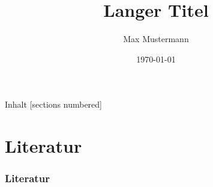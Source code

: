 \documentclass{beamer}
\title[Kurztitel]{Langer Titel}
\author{Max Mustermann}
\institute{Universität Leipzig}
\date{\today}
\begin{document}
    \maketitle

    \begin{frame}{Inhalt}
      [sections numbered]
      \tableofcontents%
    \end{frame}

    \section{Literatur}
    \begin{frame}[allowframebreaks]
        \frametitle{Literatur}
        \nocite{*}
        \printbibliography
    \end{frame}
\end{document}
